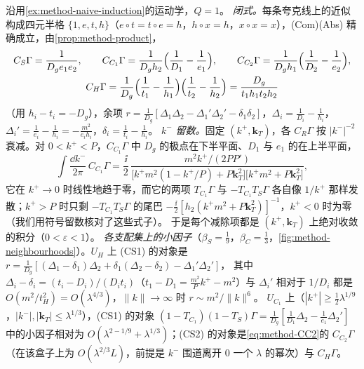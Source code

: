 \begin{example}\label{ex:method-sudakov-subtraction}
沿用\cref{ex:method-naive-induction}的运动学，$Q=1$。
\emph{闭式。}每条夸克线上的近似构成四元半格 $\{1,e,t,h\}$（$e\circ t=t\circ e=h$，$h\circ x=h$，$x\circ x=x$），(Com)(Abs) 精确成立，由\cref{prop:method-product}，
\begin{equation}\label{eq:method-tri-CR}
\begin{gathered}
C_S\Gamma=\frac1{D_ge_1e_2},\qquad C_{C_1}\Gamma=\frac1{D_gh_2}\Bigl(\frac1{D_1}-\frac1{e_1}\Bigr),\qquad C_{C_2}\Gamma=\frac1{D_gh_1}\Bigl(\frac1{D_2}-\frac1{e_2}\Bigr),\\
C_H\Gamma=\frac1{D_g}\Bigl(\frac1{t_1}-\frac1{h_1}\Bigr)\Bigl(\frac1{t_2}-\frac1{h_2}\Bigr)=\frac{D_g}{t_1h_1t_2h_2}
\end{gathered}
\end{equation}
（用 $h_i-t_i=-D_g$），余项 $r=\frac1{D_g}[\Delta_1\Delta_2-\Delta_1'\Delta_2'-\delta_1\delta_2]$，$\Delta_i=\frac1{D_i}-\frac1{h_i}$，$\Delta_i'=\frac1{e_i}-\frac1{h_i}=-\frac{m^2}{e_ih_i}$，$\delta_i=\frac1{t_i}-\frac1{h_i}$。
\emph{$k^-$ 留数。}固定 $(k^+,\mathbf k_T)$，各 $C_R\Gamma$ 按 $|k^-|^{-2}$ 衰减。对 $0<k^+<P$，$C_{C_1}\Gamma$ 中 $D_g$ 的极点在下半平面、$D_1$ 与 $e_1$ 的在上半平面，
\begin{equation}\label{eq:method-CC1-res}
\int\frac{\dd k^-}{2\pi}\,C_{C_1}\Gamma=\frac\ii2\,\frac{m^2k^+/(2PP')}{\bigl[k^+m^2(1-k^+/P)+P\mathbf k_T^2\bigr]\bigl[k^+m^2+P\mathbf k_T^2\bigr]} ,
\end{equation}
它在 $k^+\to0$ 时线性地趋于零，而它的两项 $T_{C_1}\Gamma$ 与 $-T_{C_1}T_S\Gamma$ 各自像 $1/k^+$ 那样发散；$k^+>P$ 时只剩 $-T_{C_1}T_S\Gamma$ 的尾巴 $-\frac\ii2[h_2(k^+m^2+P\mathbf k_T^2)]^{-1}$，$k^+<0$ 时为零
（我们用符号留数核对了这些式子）。%
于是每个减除项都是 $(k^+,\mathbf k_T)$ 上绝对收敛的积分（$0<\varepsilon<1$）。
\emph{各支配集上的小因子}（$\beta_S=\frac19$，$\beta_C=\frac13$，\cref{fig:method-neighbourhoods}）。$U_H$ 上 (CS1) 的对象是 $r=\frac1{D_g}[(\Delta_1-\delta_1)\Delta_2+\delta_1(\Delta_2-\delta_2)-\Delta_1'\Delta_2']$，
其中 $\Delta_i-\delta_i=(t_i-D_i)/(D_it_i)$（$t_1-D_1=\frac{m^2}Pk^+-m^2$）与 $\Delta_i'$ 相对于 $1/D_i$ 都是 $O(m^2/t_H^2)=O(\lambda^{4/3})$，$\|k\|\to\infty$ 时 $r\sim m^2/\|k\|^6$。
$U_{C_1}$ 上（$|k^+|\ge\frac12\lambda^{1/9}$，$|k^-|,|\mathbf k_T|\le\lambda^{1/3}$），(CS1) 的对象 $(1-T_{C_1})(1-T_S)\Gamma=\frac1{D_g}[\frac1{D_1}\Delta_2-\frac1{e_1}\Delta_2']$ 中的小因子相对为
$O(\lambda^{2-1/9}+\lambda^{1/3})$；(CS2) 的对象是\cref{eq:method-CC2}的 $C_{C_2}\Gamma$（在该盒子上为 $O(\lambda^{2/3}L)$，前提是 $k^-$ 围道离开 $0$ 一个 $\lambda$ 的幂次）与 $C_H\Gamma$。

\end{example}
